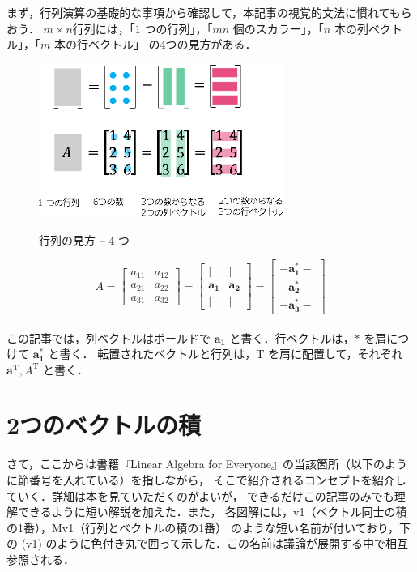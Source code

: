 \documentclass[letterpaper]{article}
\DeclareRobustCommand\transp{^{\mathrm{T}}}
\begin{document}
まず，行列演算の基礎的な事項から確認して，本記事の視覚的文法に慣れてもらおう．
$m \times n$行列には，「$1$ つの行列」，「$mn$ 個のスカラー」，「$n$ 本の列ベクトル」，「$m$ 本の行ベクトル」
の4つの見方がある．

\begin{figure}[H]
  \centering
  \includegraphics[keepaspectratio, width=8cm]{ViewingMatrix-4Ways-j.eps}\\
    \caption{行列の見方 -- 4 つ}
\end{figure}


\begin{equation*}
  A= \begin{bmatrix}
    a_{11} & a_{12}\\
    a_{21} & a_{22}\\
    a_{31} & a_{32}
  \end{bmatrix}
  =
  \begin{bmatrix}
    | & |\\
    \bm{a_1} & \bm{a_2}\\
    | & |
  \end{bmatrix}
  =
  \begin{bmatrix}
    - \bm{a_1^*} -\\
    - \bm{a_2^*} -\\
    - \bm{a_3^*} -
  \end{bmatrix}
\end{equation*} \\

この記事では，列ベクトルはボールドで $\bm{a_1}$ と書く．行ベクトルは，$\bm{*}$ を肩につけて $\bm{a_1^*}$ と書く．
転置されたベクトルと行列は，$\mathrm{T}$ を肩に配置して，それぞれ $\bm{a}\transp, A\transp$ と書く．

\section{2つのベクトルの積}

さて，ここからは書籍『Linear Algebra for Everyone』の当該箇所（以下のように節番号を入れている）を指しながら，
そこで紹介されるコンセプトを紹介していく．詳細は本を見ていただくのがよいが，
できるだけこの記事のみでも理解できるように短い解説を加えた．また，
各図解には，v1（ベクトル同士の積の1番），Mv1（行列とベクトルの積の1番）
のような短い名前が付いており，下の (v1) のように色付き丸で囲って示した．この名前は議論が展開する中で相互参照される．
\end{document}
